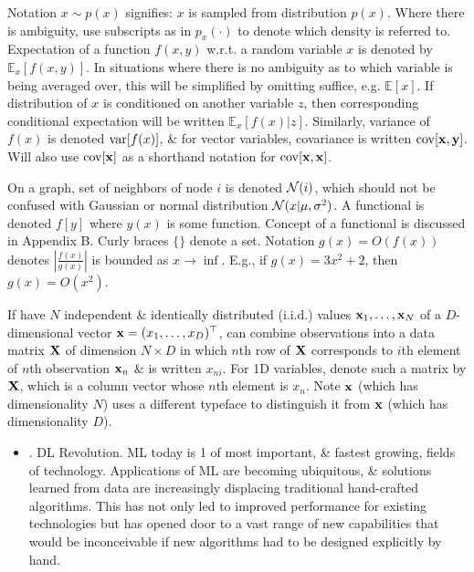 \documentclass{article}
\begin{document}
\begin{enumerate}
\begin{itemize}
		Notation $x\sim p(x)$ signifies: $x$ is sampled from distribution $p(x)$. Where there is ambiguity, use subscripts as in $p_x(\cdot)$ to denote which density is referred to. Expectation of a function $f(x,y)$ w.r.t. a random variable $x$ is denoted by $\mathbb{E}_x[f(x,y)]$. In situations where there is no ambiguity as to which variable is being averaged over, this will be simplified by omitting suffice, e.g. $\mathbb{E}[x]$. If distribution of $x$ is conditioned on another variable $z$, then corresponding conditional expectation will be written $\mathbb{E}_x[f(x)|z]$. Similarly, variance of $f(x)$ is denoted ${\rm var}[f(x)]$, \& for vector variables, covariance is written ${\rm cov}[{\bf x},{\bf y}]$. Will also use ${\rm cov}[{\bf x}]$ as a shorthand notation for ${\rm cov}[{\bf x},{\bf x}]$.
		
		On a graph, set of neighbors of node $i$ is denoted ${\cal N}(i)$, which should not be confused with Gaussian or normal distribution ${\cal N}(x|\mu,\sigma^2)$. A functional is denoted $f[y]$ where $y(x)$ is some function. Concept of a functional is discussed in Appendix B. Curly braces $\{\}$ denote a set. Notation $g(x) = O(f(x))$ denotes $\left|\frac{f(x)}{g(x)}\right|$ is bounded as $x\to\inf$. E.g., if $g(x) = 3x^2 + 2$, then $g(x) = O(x^2)$.
		
		If have $N$ independent \& identically distributed (i.i.d.) values ${\bf x}_1,\ldots,{\bf x}_N$ of a $D$-dimensional vector ${\bf x} = (x_1,\ldots,x_D)^\top$, can combine observations into a data matrix ${\bf X}$ of dimension $N\times D$ in which $n$th row of ${\bf X}$ corresponds to $i$th element of $n$th observation ${\bf x}_n$ \& is written $x_{ni}$. For 1D variables, denote such a matrix by ${\bf X}$, which is a column vector whose $n$th element is $x_n$. Note ${\bf x}$ (which has dimensionality $N$) uses a different typeface to distinguish it from ${\bf x}$ (which has dimensionality $D$).
		\begin{itemize}
			\item {. DL Revolution.} ML today is 1 of most important, \& fastest growing, fields of technology. Applications of ML are becoming ubiquitous, \& solutions learned from data are increasingly displacing traditional hand-crafted algorithms. This has not only led to improved performance for existing technologies but has opened door to a vast range of new capabilities that would be inconceivable if new algorithms had to be designed explicitly by hand.
			

\end{itemize}
\end{itemize}
\end{enumerate}
\end{document}
